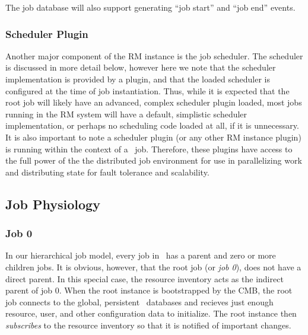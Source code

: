 The job database will also support generating ``job start'' and ``job end''
events.
\ifcomments
{} \fi

\subsubsection{Scheduler Plugin}

Another major component of the RM instance is the job scheduler.
The scheduler is discussed in more detail below, however here we
note that the scheduler implementation is provided by a plugin,
and that the loaded scheduler is configured at the time of job
instantiation. Thus, while it is expected that the root job will
likely have an advanced, complex scheduler plugin loaded, most jobs
running in the RM system will have a default, simplistic scheduler
implementation, or perhaps no scheduling code loaded at all, if
it is unnecessary. It is also important to note a scheduler plugin
(or any other RM instance plugin) is running within the context of a
\ngrm\ job. Therefore, these plugins have access to the full power
of the the distributed job environment for use in parallelizing
work and distributing state for fault tolerance and scalability.

\subsection{Job Physiology}

\subsubsection{Job 0}

In our hierarchical job model, every job in \ngrm\ has a parent
and zero or more children jobs. It is obvious, however, that
the root job (or \emph{job 0}), does not have a direct parent.
In this special case, the resource inventory acts as the
indirect parent of job 0. When the root instance is bootstrapped
by the CMB, the root job connects to the global, persistent
\ngrm\ databases and recieves just enough resource, user, and other
configuration data to initialize. The root instance then
\emph{subscribes} to the resource inventory so that it is
notified of important changes.
\ifcomments
{}
\fi

